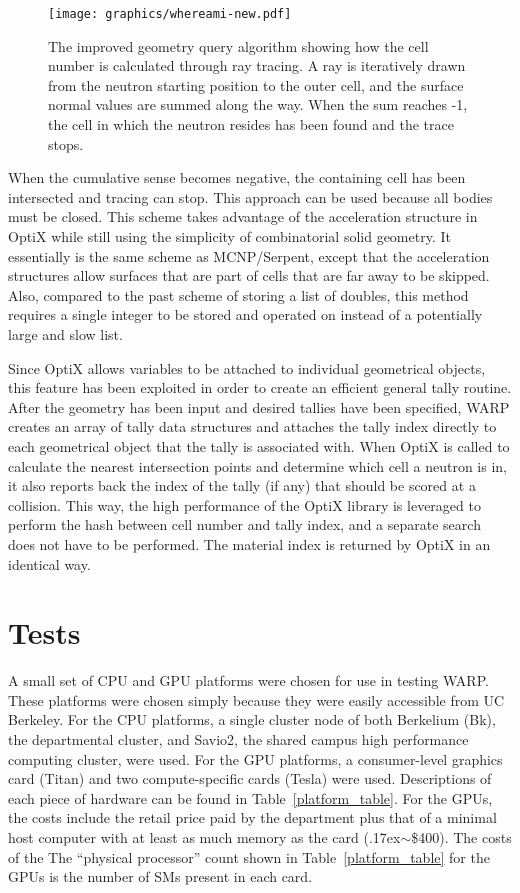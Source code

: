 \documentclass[preprint,12pt]{elsarticle}
\begin{document}
\begin{figure}[!htbp]
\centering
\texttt{[image: graphics/whereami-new.pdf]}
\caption{The improved geometry query algorithm showing how the cell number is calculated through ray tracing.  A ray is iteratively drawn from the neutron starting position to the outer cell, and the surface normal values are summed along the way.  When the sum reaches -1, the cell in which the neutron resides has been found and the trace stops. \label{whereami} }
\end{figure}

 When the cumulative sense becomes negative, the containing cell has been intersected and tracing can stop.  This approach can be used because all bodies must be closed.  This scheme takes advantage of the acceleration structure in OptiX while still using the simplicity of combinatorial solid geometry.  It essentially is the same scheme as MCNP/Serpent, except that the acceleration structures allow surfaces that are part of cells that are far away to be skipped.  Also, compared to the past scheme of storing a list of doubles, this method requires a single integer to be stored and operated on instead of a potentially large and slow list. 

Since OptiX allows variables to be attached to individual geometrical objects, this feature has been exploited in order to create an efficient general tally routine.  After the geometry has been input and desired tallies have been specified, WARP creates an array of tally data structures and attaches the tally index directly to each geometrical object that the tally is associated with.  When OptiX is called to calculate the nearest intersection points and determine which cell a neutron is in, it also reports back the index of the tally (if any) that should be scored at a collision.  This way, the high performance of the OptiX library is leveraged to perform the hash between cell number and tally index, and a separate search does not have to be performed.  The material index is returned by OptiX in an identical way.


\newpage
\section{Tests}
\label{sec:tests}

A small set of CPU and GPU platforms were chosen for use in testing WARP.  These platforms were chosen simply because they were easily accessible from UC Berkeley.  For the CPU platforms, a single cluster node of both Berkelium (Bk), the departmental cluster, and Savio2, the shared campus high performance computing cluster, were used.  For the GPU platforms, a consumer-level graphics card (Titan) and two compute-specific cards (Tesla) were used.  Descriptions of each piece of hardware can be found in Table~\ref{platform_table}. For the GPUs, the costs include the retail price paid by the department plus that of a minimal host computer with at least as much memory as the card ({\raise.17ex\hbox{$\scriptstyle\sim$}}\$400).  The costs of the   The ``physical processor'' count shown in Table~\ref{platform_table} for the GPUs is the number of SMs present in each card.  
\end{document}

